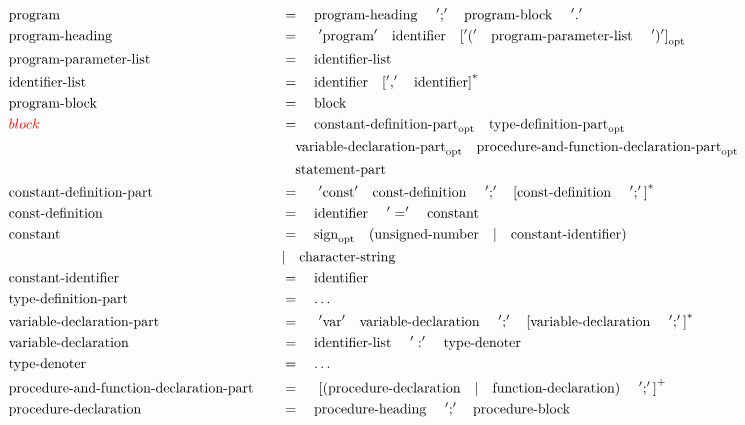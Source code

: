 \documentclass{article}
\begin{document}
\begin{alignat*}{2}
&\text{program}\quad&&=\quad\text{program-heading}\quad\ ';'\quad \text{program-block}\quad\ '.'\\
&\text{program-heading}\quad&&=\quad\ '\text{program}'\quad \text{identifier}\quad {['('\quad\text{program-parameter-list}\quad\ ')']}_\text{opt}\\
&\text{program-parameter-list}\quad&&=\quad\text{identifier-list}\\
&\text{identifier-list}\quad&&=\quad\text{identifier}\quad{[','\quad\text{identifier}]}^*\\
&\text{program-block}\quad&&=\quad\text{block}\\
&\textcolor{red}{block}\quad&&=\quad\text{constant-definition-part}_\text{opt}\quad\text{type-definition-part}_\text{opt}\\
&&&\quad\text{variable-declaration-part}_\text{opt}\quad\text{procedure-and-function-declaration-part}_\text{opt}\\
&&&\quad\text{statement-part}\\
&\text{constant-definition-part}\quad&&=\quad\ '\text{const}'\quad\text{const-definition}\quad\ ';'\quad {[\text{const-definition}\quad\ ';']}^* \\
&\text{const-definition}\quad&&=\quad\text{identifier}\quad\ '=' \quad\text{constant}\\
&\text{constant}\quad&&=\quad\text{sign}_\text{opt}\quad(\text{unsigned-number}\quad |\quad \text{constant-identifier})\\
&&&|\quad\text{character-string}\\
&\text{constant-identifier}\quad&&=\quad\text{identifier}\\
&\text{type-definition-part}\quad&&=\quad\dots\\
&\text{variable-declaration-part}\quad&&=\quad\ '\text{var}'\quad\text{variable-declaration}\quad\ ';'\quad {[\text{variable-declaration}\quad\ ';']}^* \\
&\text{variable-declaration}\quad&&=\quad\text{identifier-list}\quad\ ':' \quad\text{type-denoter}\\
&\text{type-denoter}\quad&&=\quad\dots\\
&\text{procedure-and-function-declaration-part}\quad&&=\quad\ {[(\text{procedure-declaration}\quad|\quad\text{function-declaration})\quad\ ';']}^+\\
&\text{procedure-declaration}\quad&&=\quad\text{procedure-heading}\quad\ ';'\quad\text{procedure-block}\\

\end{alignat*}
\end{document}
